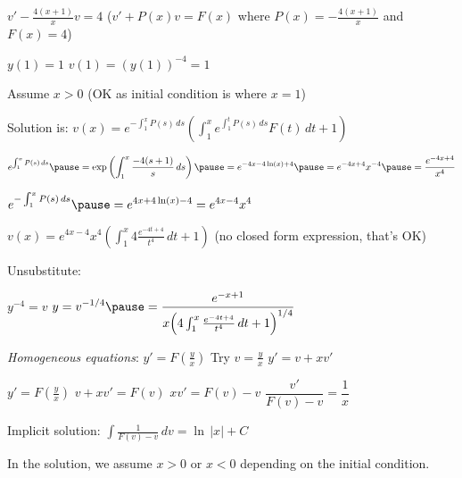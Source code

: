 \documentclass[10pt,aspectratio=169]{beamer}
\begin{document}
\begin{frame}

$v'- \frac{4(x+1)}{x} v  = 4$
\quad
($v' + P(x) v = F(x)$ where $P(x) = - \frac{4(x+1)}{x}$ and $F(x) = 4$)

\medskip
\pause

$y(1) = 1$ \wthus $v(1) = {(y(1))}^{-4} = 1$

\medskip
\pause

Assume $x > 0$ (OK as initial condition is where $x = 1$)

\medskip
\pause

Solution is:
\qquad
$\displaystyle
v(x) = e^{-\int_1^x P(s) \, ds} \left(
\int_1^x 
e^{\int_1^t P(s) \, ds}
F(t) \, dt
+
1 \right)$

\medskip
\pause

$\displaystyle
e^{\int_1^x P(s)\,ds}
\pause
= \exp \left( \int_1^x \frac{-4(s+1)}{s} \,ds \right)
\pause
=
e^{-4x-4\ln(x)+4}
\pause
= 
e^{-4x+4} x^{-4}
\pause
=
\frac{e^{-4x+4}}{x^4}$

\medskip
\pause

$\displaystyle
e^{-\int_1^x P(s)\,ds}
\pause
=
e^{4x+4\ln(x)-4}
= 
e^{4x-4} x^4$

\medskip
\pause

\thus \quad
$\displaystyle
v(x)
=
e^{4x-4} x^4
\left( \int_{1}^x 4 \frac{e^{-4t+4}}{t^4} \,dt
+ 1 \right)$
\qquad
\pause
(no closed form expression, that's OK)

\medskip
\pause

Unsubstitute:
\medskip

\quad
$y^{-4} = v$
\pause
\wthus
$\displaystyle
y = v^{-1/4}
\pause
= \frac{e^{-x+1}}{x {\left( 4 \int_1^x \frac{e^{-4t+4}}{t^4} \,dt + 1\right)}^{1/4}}$

\end{frame}

\begin{frame}

\emph{Homogeneous equations}:
\quad
$y' = F\left(\frac{y}{x}\right)$
\pause
\quad
Try
$v = \frac{y}{x}$
\pause
\qquad
$y' = v + x v'$

\medskip
\pause

$y' = F\left(\frac{y}{x}\right)$
\wthus
$v+ xv' = F(v)$
\pause
\wthus
$xv' = F(v)-v$
\pause
\wthus
$\dfrac{v'}{F(v)-v} = \dfrac{1}{x}$

\medskip
\pause

Implicit solution:
\quad
$\displaystyle
\int \frac{1}{F(v)-v} \,dv = \ln \, \lvert x \rvert + C$

\medskip
\pause

In the solution, we assume $x > 0$ or $x < 0$ depending on the initial
condition.

\end{frame}
\end{document}
